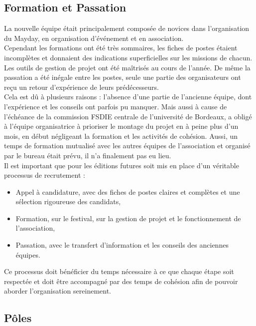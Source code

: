 \documentclass[12pt,a4paper]{report}
\begin{document}
\subsection{Formation et Passation}

La nouvelle équipe était principalement composée de novices dans l’organisation du Mayday, en organisation d’événement et en association.\\

Cependant les formations ont été très sommaires, les fiches de postes étaient incomplètes et donnaient des indications superficielles sur les missions de chacun. Les outils de gestion de projet ont été maîtrisés au cours de l’année. De même la passation a été inégale entre les postes, seule une partie des organisateurs ont reçu un retour d’expérience de leurs prédécesseurs.\\

Cela est dû à plusieurs raisons : l’absence d’une partie de l’ancienne équipe, dont l’expérience et les conseils ont parfois pu manquer. Mais aussi à cause de l’échéance de la commission FSDIE centrale de l’université de Bordeaux, a obligé à l’équipe organisatrice à prioriser le montage du projet en à peine plus d’un mois, en début négligeant la formation et les activités de cohésion. Aussi, un temps de formation mutualisé avec les autres équipes de l’association et organisé par le bureau était prévu, il n’a finalement pas eu lieu.\\

Il est important que pour les éditions futures soit mis en place d’un véritable processus de recrutement :
\begin{itemize}
\item Appel à candidature, avec des fiches de postes claires et complètes et une sélection rigoureuse des candidats,
\item Formation, sur le festival, sur la gestion de projet et le fonctionnement de l’association,
\item Passation, avec le transfert d’information et les conseils des anciennes équipes.\\
\end{itemize}
Ce processus doit bénéficier du temps nécessaire à ce que chaque étape soit respectée et doit être accompagné par des temps de cohésion afin de pouvoir aborder l’organisation sereinement.

\subsection{Pôles}
\end{document}
